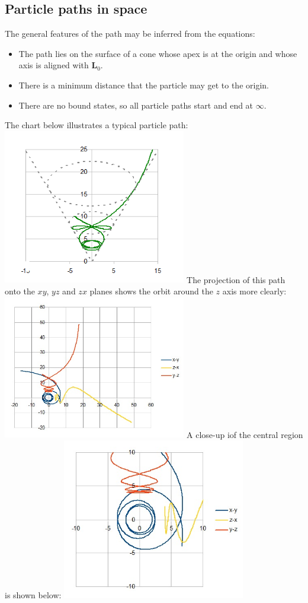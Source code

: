 \documentclass[twocolumn]{article}
\begin{document}
\subsection{Particle paths in space}
The general features of the path may be inferred from the equations:
\begin{itemize}
  \item The path lies on the surface of a cone whose apex is at the origin and whose axis is aligned with $\mathbf L_0$.
  \item There is a minimum distance that the particle may get to the origin.
  \item There are no bound states, so all particle paths start and end at $\infty$.
\end{itemize}
\noindent
The chart below illustrates a typical particle path:
\includegraphics[width=80mm]{mm1.jpg}
The projection of this path onto the $xy$, $yz$ and $zx$ planes shows the orbit around the $z$ axis more clearly:
\includegraphics[width=80mm]{mm2.jpg}
A close-up iof the central region is shown below:
\includegraphics[width=80mm]{mm3.jpg}
\end{document}
